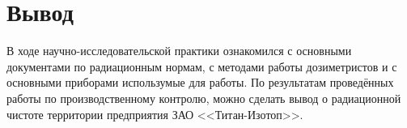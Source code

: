 \chapter{Вывод}
	В ходе научно-исследовательской практики ознакомился с основными 
	документами по радиационным нормам, с методами работы дозиметристов и 
	с основными приборами использумые для работы. По результатам проведённых 
	работы по производственному контролю, можно сделать вывод о радиационной 
	чистоте территории предприятия ЗАО <<Титан-Изотоп>>.

\clearpage